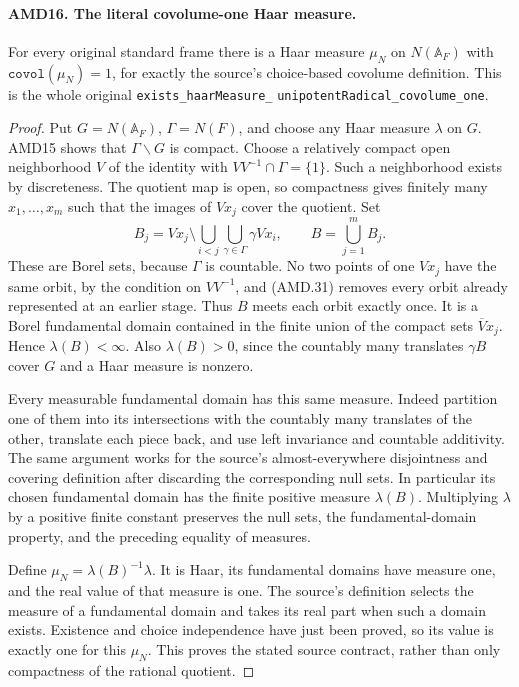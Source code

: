 
\paragraph{AMD16. The literal covolume-one Haar measure.}
\label{claim:AMD16}
For every original standard frame there is a Haar measure
\(\mu_N\) on \(N(\mathbb A_F)\) with
\(\texttt{covol}(\mu_N)=1\), for exactly the source's
choice-based covolume definition.  This is the whole original
\texttt{exists\_haarMeasure\_}\allowbreak
\texttt{unipotentRadical\_}\allowbreak\texttt{covolume\_one}.

\begin{proof}
Put \(G=N(\mathbb A_F)\), \(\Gamma=N(F)\), and choose
any Haar measure \(\lambda\) on \(G\).  AMD15 shows that
\(\Gamma\backslash G\) is compact.  Choose a relatively
compact open neighborhood \(V\) of the identity with
\(VV^{-1}\cap\Gamma=\{1\}\).  Such a neighborhood exists
by discreteness.  The quotient map is open, so compactness
gives finitely many \(x_1,\ldots,x_m\) such that the images
of \(Vx_j\) cover the quotient.  Set
\[
 B_j=Vx_j\setminus\bigcup_{i<j}\bigcup_{\gamma\in\Gamma}
                                     \gamma Vx_i,
 \qquad B=\bigcup_{j=1}^m B_j.
 \tag{AMD.31}
\]
These are Borel sets, because \(\Gamma\) is countable.
No two points of one \(Vx_j\) have the same orbit, by the
condition on \(VV^{-1}\), and (AMD.31) removes every orbit
already represented at an earlier stage.  Thus \(B\) meets
each orbit exactly once.  It is a Borel fundamental domain
contained in the finite union of the compact sets
\(\overline Vx_j\).  Hence \(\lambda(B)<\infty\).
Also \(\lambda(B)>0\), since the countably many translates
\(\gamma B\) cover \(G\) and a Haar measure is nonzero.

Every measurable fundamental domain has this same measure.
Indeed partition one of them into its intersections with the
countably many translates of the other, translate each piece
back, and use left invariance and countable additivity.  The
same argument works for the source's almost-everywhere
disjointness and covering definition after discarding the
corresponding null sets.  In particular its chosen fundamental
domain has the finite positive measure \(\lambda(B)\).
Multiplying \(\lambda\) by a positive finite constant
preserves the null sets, the fundamental-domain property, and
the preceding equality of measures.

Define \(\mu_N=\lambda(B)^{-1}\lambda\).  It is Haar,
its fundamental domains have measure one, and the real value
of that measure is one.  The source's definition selects the
measure of a fundamental domain and takes its real part when
such a domain exists.  Existence and choice independence have
just been proved, so its value is exactly one for this
\(\mu_N\).  This proves the stated source contract, rather
than only compactness of the rational quotient.
\end{proof}

